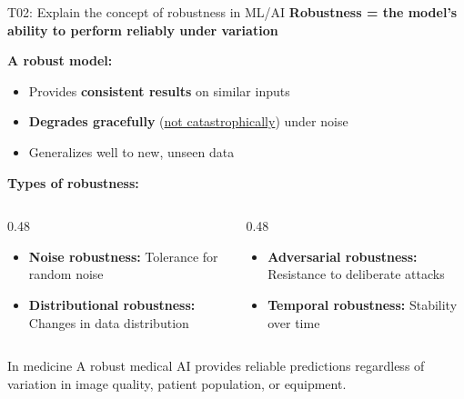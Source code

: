 \documentclass[aspectratio=169, 10pt]{beamer}
\begin{document}
\begin{frame}{T02: Explain the concept of robustness in ML/AI}
    \textbf{Robustness = the model's ability to perform reliably under variation}
    
    \vspace{0.2cm}
    \textbf{A robust model:}
    \begin{itemize}
        \item Provides \textbf{consistent results} on similar inputs
        \item \textbf{Degrades gracefully} (\href{https://en.wikipedia.org/wiki/Graceful_degradation}{not catastrophically}) under noise
        \item Generalizes well to new, unseen data
    \end{itemize}
    
    \vspace{0.2cm}
    \textbf{Types of robustness:}
    \begin{columns}[T]
        \begin{column}{0.48\textwidth}
            \begin{itemize}
                \item \textbf{Noise robustness:} Tolerance for random noise
                \item \textbf{Distributional robustness:} Changes in data distribution
            \end{itemize}
        \end{column}
        \begin{column}{0.48\textwidth}
            \begin{itemize}
                \item \textbf{Adversarial robustness:} Resistance to deliberate attacks
                \item \textbf{Temporal robustness:} Stability over time
            \end{itemize}
        \end{column}
    \end{columns}
    
    \vspace{0.15cm}
    {\small
    \begin{block}{In medicine}
        A robust medical AI provides reliable predictions regardless of variation in image quality, patient population, or equipment.
    \end{block}
    }
\end{frame}
\end{document}
